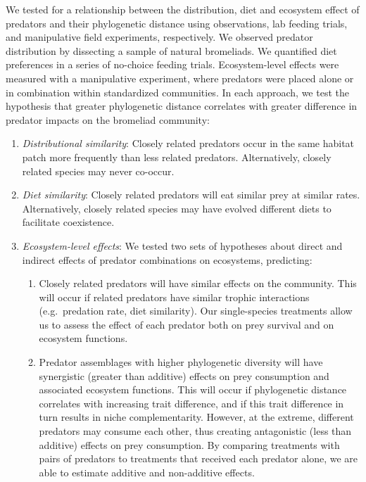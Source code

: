 We tested for a relationship between the distribution, diet and
ecosystem effect of predators and their phylogenetic distance using
observations, lab feeding trials, and manipulative field experiments,
respectively. We observed predator distribution by dissecting a sample
of natural bromeliads. We quantified diet preferences in a series of
no-choice feeding trials. Ecosystem-level effects were measured with a
manipulative experiment, where predators were placed alone or in
combination within standardized communities. In each approach, we test
the hypothesis that greater phylogenetic distance correlates with
greater difference in predator impacts on the bromeliad community:

\begin{enumerate}
\def\labelenumi{\arabic{enumi}.}
\item
  \emph{Distributional similarity}: Closely related predators occur in
  the same habitat patch more frequently than less related predators.
  Alternatively, closely related species may never co-occur.
\item
  \emph{Diet similarity}: Closely related predators will eat similar
  prey at similar rates. Alternatively, closely related species may have
  evolved different diets to facilitate coexistence.
\item
  \emph{Ecosystem-level effects}: We tested two sets of hypotheses about
  direct and indirect effects of predator combinations on ecosystems,
  predicting:

  \begin{enumerate}
  \def\labelenumii{(\alph{enumii})}
  \item
    Closely related predators will have similar effects on the
    community. This will occur if related predators have similar trophic
    interactions (e.g.~predation rate, diet similarity). Our
    single-species treatments allow us to assess the effect of each
    predator both on prey survival and on ecosystem functions.
  \item
    Predator assemblages with higher phylogenetic diversity will have
    synergistic (greater than additive) effects on prey consumption and
    associated ecosystem functions. This will occur if phylogenetic
    distance correlates with increasing trait difference, and if this
    trait difference in turn results in niche complementarity. However,
    at the extreme, different predators may consume each other, thus
    creating antagonistic (less than additive) effects on prey
    consumption. By comparing treatments with pairs of predators to
    treatments that received each predator alone, we are able to
    estimate additive and non-additive effects.
  \end{enumerate}
\end{enumerate}

